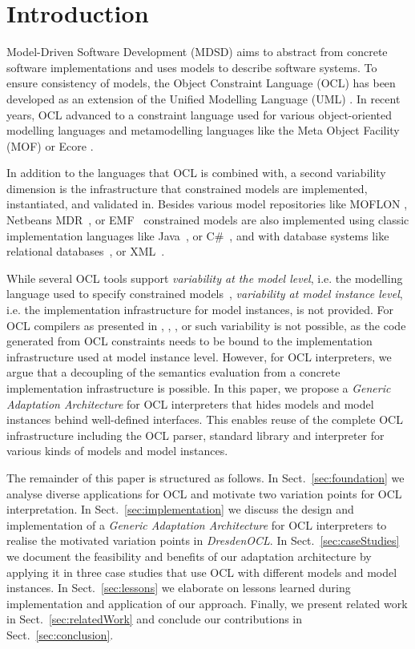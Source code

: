 \section{Introduction}
	
	Model-Driven Software Development (MDSD) aims to abstract from concrete 
	software implementations and uses models to describe software systems. 
	To ensure consistency of models, the Object Constraint Language 
	(OCL) \cite{spec:OCL2-2} has been developed as an extension of the Unified 
	Modelling Language (UML) \cite{spec:UML2-2}\cite{warmer:ocl}. In recent years,
	OCL advanced to a constraint language used for various object-oriented
	modelling languages \cite{detaching} and metamodelling languages like the Meta
	Object Facility (MOF) \cite{UmlMof} or Ecore \cite{WWW:MDT}.

	In addition to the languages that OCL is combined with, a second variability
	dimension is the infrastructure that constrained models are implemented, 
	instantiated, and validated in. Besides various model repositories
	like MOFLON \cite{MOFLON}, Netbeans MDR~\cite{UmlMof}, or EMF~\cite{WWW:MDT}
	constrained models are also implemented using classic implementation languages like
	Java~\cite{demuthRGWS09}, or C\#~\cite{OCLCsharp}, and with database systems
	like relational databases~\cite{OCLRelDB}, or XML~\cite{OCLXML}. 
	
	While several OCL tools support \emph{variability at the model level}, i.e.
	the modelling language used to specify constrained
	models~\cite{braeuerOCL07}\cite{akehurst2003ocl}, \emph{variability at model
	instance level}, i.e. the implementation infrastructure for model instances, is not provided. 
	For OCL compilers as presented in
	\cite{UmlMof}, \cite{demuthRGWS09}, \cite{OCLCsharp}, or \cite{OCLRelDB} 
	such variability is not possible, as the code generated from OCL constraints 
	needs to be	bound to the implementation infrastructure used at model instance
	level. 
	However, for OCL interpreters, we argue that a
	decoupling of the semantics evaluation from a concrete implementation infrastructure is possible.
	In this paper, we propose a \emph{Generic Adaptation Architecture} for OCL
	interpreters that hides models and model instances behind well-defined
	interfaces. This enables reuse of the complete OCL infrastructure including the OCL parser, 
	standard library and interpreter for various kinds of models and model instances.
	
	The remainder of this paper is structured as follows. In
	Sect.~\ref{sec:foundation} we analyse diverse applications for OCL and 
	motivate two variation points for OCL interpretation. In
	Sect.~\ref{sec:implementation} we discuss the design and implementation of a
	\emph{Generic Adaptation Architecture} for OCL interpreters to realise the
	motivated variation points in \emph{DresdenOCL}. In Sect.~\ref{sec:caseStudies}
	we document the feasibility and	benefits of our adaptation architecture by
	applying it in three case studies that use OCL with different models and model
	instances. In Sect.~\ref{sec:lessons} we elaborate on lessons learned
	during implementation and application of our approach. Finally, we present
	related work in Sect.~\ref{sec:relatedWork} and conclude our contributions in
	Sect.~\ref{sec:conclusion}.
	
